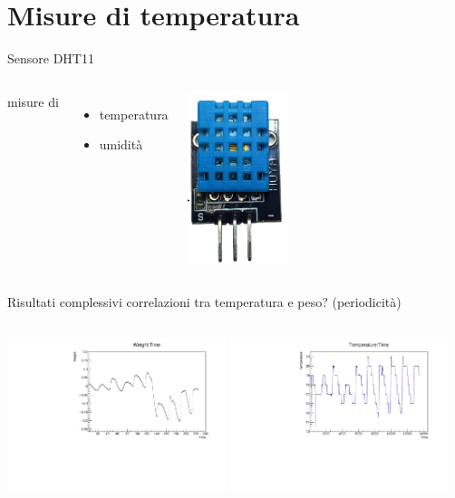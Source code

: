 \documentclass{beamer}
\begin{document}
\section{Misure di temperatura}
\begin{frame}{Sensore DHT11}
  \begin{columns}[c] 
      misure di 
      \begin{itemize}
        \item temperatura
        \item umidit\`a
      \end{itemize}
      \includegraphics[height=5cm]{../Foto/DHT11}
   \end{columns}
\end{frame}
\begin{frame}{Risultati complessivi}
  correlazioni tra temperatura e peso? (periodicit\`a)
  \begin{columns}[c] 
      \includegraphics[height=4.5cm]{../../analisi_dati/171010_long_sd_temp/M_Weight}
      \includegraphics[height=4.5cm]{../../analisi_dati/171010_long_sd_temp/M_Temperature}   
   \end{columns}
\end{frame}
\end{document}

